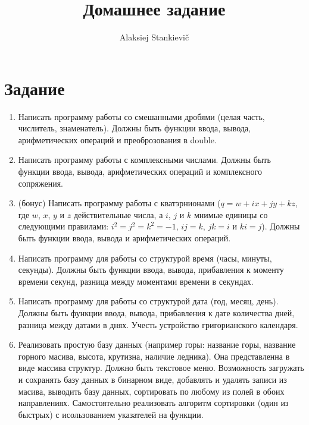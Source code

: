 \documentclass[12pt]{article}
\author{Alaksiej Stankievič}
\title{Домашнее задание}
\begin{document}

\section{Задание}


\begin{enumerate}
 \item Написать программу работы со смешанными дробями (целая часть, числитель, знаменатель). Должны быть функции
ввода, вывода, арифметических операций и преоброзования в double.
 \item Написать программу работы с комплексными числами. Должны быть функции ввода, вывода, арифметических операций и
комплексного сопряжения.
 \item (бонус) Написать программу работы с кватэрнионами ($q=w+ix+jy+kz$, где $w$, $x$, $y$ и $z$ действительные числа,
а $i$, $j$ и $k$ мнимые единицы со следующими правилами: $i^2=j^2=k^2=-1$, $ij=k$, $jk=i$ и $ki=j$). Должны быть функции
ввода, вывода и арифметических операций.
 \item Написать программу для работы со структурой время (часы, минуты, секунды). Должны быть функции
ввода, вывода, прибавления к моменту времени секунд, разница между моментами времени в секундах.
 \item Написать программу для работы со структурой дата (год, месяц, день). Должны быть функции
ввода, вывода, прибавления к дате количества дней, разница между датами в днях. Учесть устройство григорианского
календаря.
 \item Реализовать простую базу данных (например горы: название горы, название горного масива, высота, крутизна,
наличие ледника). Она представленна в виде массива структур. Должно быть текстовое меню. Возможность загружать и
сохранять базу данных в бинарном виде, добавлять и удалять записи из масива, выводить базу данных, сортировать по
любому из полей в обоих направлениях. Самостоятельно реализовать алгоритм сортировки (один из быстрых) с исользованием
указателей на функции.
 \end{enumerate}
\end{document}
